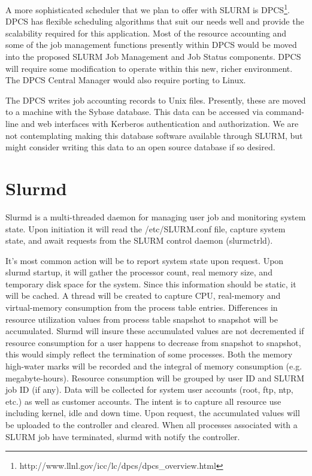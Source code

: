 A more sophisticated scheduler that we plan to offer with SLURM is 
DPCS\footnote{http://www.llnl.gov/icc/lc/dpcs/dpcs\_overview.html}. 
DPCS has flexible scheduling algorithms that suit our needs well and
provide the scalability required for this application. Most of the resource
accounting and some of the job management functions presently within DPCS would
be moved into the proposed SLURM Job Management and Job Status components. 
DPCS will require some modification to operate within this new, richer
environment. The DPCS Central Manager would also require porting to Linux. 

The DPCS writes job accounting records to Unix files. Presently, these are
moved to a machine with the Sybase database. This data can be accessed via
command-line and web interfaces with Kerberos authentication and authorization.
We are not contemplating making this database software available through SLURM,
but might consider writing this data to an open source database if so desired.

\section{Slurmd}

Slurmd is a multi-threaded daemon for managing user job and 
monitoring system state. 
Upon initiation it will read the /etc/SLURM.conf file, capture 
system state, and await requests from the SLURM control daemon 
(slurmctrld). 

It's most common action will be to report system state upon 
request. Upon slurmd startup, it will gather the processor 
count, real memory size, and temporary disk space for the 
system. Since this information should be static, it will be 
cached. A thread will be created to capture CPU, real-memory 
and virtual-memory consumption from the process table entries. 
Differences in resource utilization values from process table 
snapshot to snapshot will be accumulated. Slurmd will 
insure these accumulated values are not decremented if resource 
consumption for a user happens to decrease from snapshot to 
snapshot, this would simply reflect the termination of some 
processes.
Both the memory high-water marks will be recorded and the 
integral of memory consumption (e.g. megabyte-hours).
Resource consumption will be grouped by user ID and 
SLURM job ID (if any). Data will be collected for 
system user accounts (root, ftp, ntp, etc.) as well as 
customer accounts. The intent is to capture all resource 
use including kernel, idle and down time. 
Upon request, the accumulated values will be uploaded to 
the controller and cleared. 
When all processes associated with a SLURM job have terminated, 
slurmd with notify the controller. 

